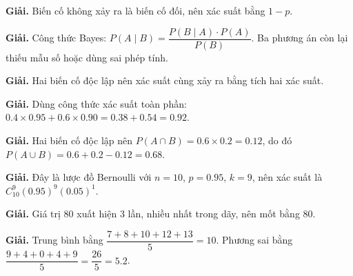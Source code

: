 \documentclass[11pt, a4paper]{article}
\begin{document}
\vspace{0.3cm}
\begin{dapan}[37 — Đáp án D]

\textbf{Giải.} Biến cố không xảy ra là biến cố đối, nên xác suất bằng $1-p$.


\end{dapan}
\vspace{0.3cm}
\begin{dapan}[38 — Đáp án C]

\textbf{Giải.} Công thức Bayes: $P(A \mid B)=\dfrac{P(B \mid A) \cdot P(A)}{P(B)}$. Ba phương án còn lại thiếu mẫu số hoặc dùng sai phép tính.


\end{dapan}
\vspace{0.3cm}
\begin{dapan}[39 — Đáp án B]

\textbf{Giải.} Hai biến cố độc lập nên xác suất cùng xảy ra bằng tích hai xác suất.


\end{dapan}
\vspace{0.3cm}
\begin{dapan}[40 — Đáp án B]

\textbf{Giải.} Dùng công thức xác suất toàn phần: $0.4 \times 0.95+0.6 \times 0.90=0.38+0.54=0.92$.


\end{dapan}
\vspace{0.3cm}
\begin{dapan}[41 — Đáp án B]

\textbf{Giải.} Hai biến cố độc lập nên $P(A \cap B)=0.6 \times 0.2=0.12$, do đó $P(A \cup B)=0.6+0.2-0.12=0.68$.


\end{dapan}
\vspace{0.3cm}
\begin{dapan}[42 — Đáp án B]

\textbf{Giải.} Đây là lược đồ Bernoulli với $n=10$, $p=0.95$, $k=9$, nên xác suất là $C_{10}^9 (0.95)^9 (0.05)^1$.


\end{dapan}
\vspace{0.3cm}
\begin{dapan}[43 — Đáp án A]

\textbf{Giải.} Giá trị $80$ xuất hiện 3 lần, nhiều nhất trong dãy, nên mốt bằng $80$.


\end{dapan}
\vspace{0.3cm}
\begin{dapan}[44 — Đáp án C]

\textbf{Giải.} Trung bình bằng $\dfrac{7+8+10+12+13}{5}=10$. Phương sai bằng $\dfrac{9+4+0+4+9}{5}=\dfrac{26}{5}=5.2$.


\end{dapan}
\end{document}
